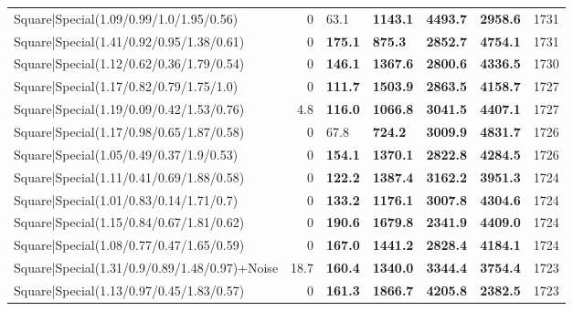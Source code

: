 \begin{tabular}{lrllllr}
 Square|Special(1.09/0.99/1.0/1.95/0.56)                       &             0   & 63.1           & \textbf{1143.1} & \textbf{4493.7} & \textbf{2958.6} &         1731 \\
 Square|Special(1.41/0.92/0.95/1.38/0.61)                      &             0   & \textbf{175.1} & \textbf{875.3}  & \textbf{2852.7} & \textbf{4754.1} &         1731 \\
 Square|Special(1.12/0.62/0.36/1.79/0.54)                      &             0   & \textbf{146.1} & \textbf{1367.6} & \textbf{2800.6} & \textbf{4336.5} &         1730 \\
 Square|Special(1.17/0.82/0.79/1.75/1.0)                       &             0   & \textbf{111.7} & \textbf{1503.9} & \textbf{2863.5} & \textbf{4158.7} &         1727 \\
 Square|Special(1.19/0.09/0.42/1.53/0.76)                      &             4.8 & \textbf{116.0} & \textbf{1066.8} & \textbf{3041.5} & \textbf{4407.1} &         1727 \\
 Square|Special(1.17/0.98/0.65/1.87/0.58)                      &             0   & 67.8           & \textbf{724.2}  & \textbf{3009.9} & \textbf{4831.7} &         1726 \\
 Square|Special(1.05/0.49/0.37/1.9/0.53)                       &             0   & \textbf{154.1} & \textbf{1370.1} & \textbf{2822.8} & \textbf{4284.5} &         1726 \\
 Square|Special(1.11/0.41/0.69/1.88/0.58)                      &             0   & \textbf{122.2} & \textbf{1387.4} & \textbf{3162.2} & \textbf{3951.3} &         1724 \\
 Square|Special(1.01/0.83/0.14/1.71/0.7)                       &             0   & \textbf{133.2} & \textbf{1176.1} & \textbf{3007.8} & \textbf{4304.6} &         1724 \\
 Square|Special(1.15/0.84/0.67/1.81/0.62)                      &             0   & \textbf{190.6} & \textbf{1679.8} & \textbf{2341.9} & \textbf{4409.0} &         1724 \\
 Square|Special(1.08/0.77/0.47/1.65/0.59)                      &             0   & \textbf{167.0} & \textbf{1441.2} & \textbf{2828.4} & \textbf{4184.1} &         1724 \\
 Square|Special(1.31/0.9/0.89/1.48/0.97)+Noise                 &            18.7 & \textbf{160.4} & \textbf{1340.0} & \textbf{3344.4} & \textbf{3754.4} &         1723 \\
 Square|Special(1.13/0.97/0.45/1.83/0.57)                      &             0   & \textbf{161.3} & \textbf{1866.7} & \textbf{4205.8} & \textbf{2382.5} &         1723 \\

\end{tabular}
